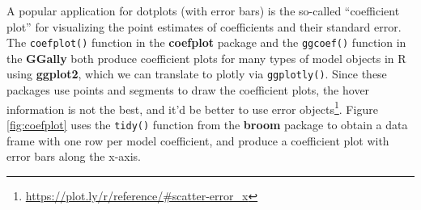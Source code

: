 \documentclass[
  12pt,
]{krantz}
\newenvironment{Shaded}{\begin{snugshade}}{\end{snugshade}}
\newcommand{\CommentTok}[1]{\textcolor[rgb]{0.56,0.35,0.01}{\textit{#1}}}
\newcommand{\DataTypeTok}[1]{\textcolor[rgb]{0.13,0.29,0.53}{#1}}
\newcommand{\KeywordTok}[1]{\textcolor[rgb]{0.13,0.29,0.53}{\textbf{#1}}}
\newcommand{\NormalTok}[1]{#1}
\newcommand{\OperatorTok}[1]{\textcolor[rgb]{0.81,0.36,0.00}{\textbf{#1}}}
\newcommand{\StringTok}[1]{\textcolor[rgb]{0.31,0.60,0.02}{#1}}
\renewcommand{\href}[2]{#2\footnote{\url{#1}}}
\begin{document}
A popular application for dotplots (with error bars) is the so-called ``coefficient plot'' for visualizing the point estimates of coefficients and their standard error. The \texttt{coefplot()} function in the \textbf{coefplot} package \citep{coefplot} and the \texttt{ggcoef()} function in the \textbf{GGally} both produce coefficient plots for many types of model objects in R using \textbf{ggplot2}, which we can translate to plotly via \texttt{ggplotly()}. Since these packages use points and segments to draw the coefficient plots, the hover information is not the best, and it'd be better to use \href{https://plot.ly/r/reference/\#scatter-error_x}{error objects}. Figure \ref{fig:coefplot} uses the \texttt{tidy()} function from the \textbf{broom} package \citep{broom} to obtain a data frame with one row per model coefficient, and produce a coefficient plot with error bars along the x-axis.

\begin{Shaded}
\end{Shaded}
\end{document}
